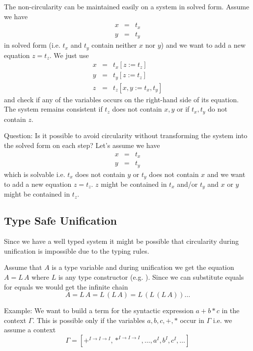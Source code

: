 The non-circularity can be maintained easily on a system in solved
form. Assume we have
$$
%
\begin{array}{lll}
  x &=& t_x
  \\
  y &=& t_y
\end{array}
$$
%
in solved form (i.e. $t_x$ and $t_y$ contain neither $x$ nor $y$) and we want
to add a new equation $z = t_z$. We just use
$$
%
\begin{array}{lll}
  x &=& t_x[z := t_z]
  \\
  y &=& t_y[z := t_z]
  \\
  z &=& t_z[x,y := t_x, t_y]
\end{array}
$$
%
and check if any of the variables occurs on the right-hand side of its
equation. The system remains consistent if $t_z$ does not contain $x,y$ or if
$t_x,t_y$ do not contain $z$.


Question: Is it possible to avoid circularity without transforming the system
into the solved form on each step? Let's assume we have
$$
%
\begin{array}{lll}
  x &=& t_x
  \\
  y &=& t_y
\end{array}
$$
%
which is solvable i.e. $t_x$ does not contain $y$ or $t_y$ does not contain
$x$ and we want to add a new equation $z = t_z$. $z$ might be contained in
$t_x$ and/or $t_y$ and $x$ or $y$ might be contained in $t_z$.




\subsection{Type Safe Unification}

Since we have a well typed system it might be possible that circularity during
unification is impossible due to the typing rules.

Assume that $A$ is a type variable and during unification we get the equation
$A = L\, A$ where $L$ is any type constructor (e.g. ). Since we can
substitute equals for equals we would get the infinite chain
$$
  A = L\, A = L\, (L\, A) = L\, (L\, (L\, A)) \ldots
$$



Example: We want to build a term for the syntactic expression $a + b * c$ in
the context $\Gamma$. This is possible only if the variables $a, b, c, +, *$
occur in $\Gamma$ i.e. we assume a context
$$
\Gamma = [+^{I\to I\to I}, *^{I\to I\to I}, \ldots, a^I, b^I, c^I, \ldots]
$$



